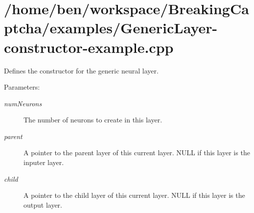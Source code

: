 \hypertarget{_2home_2ben_2workspace_2BreakingCaptcha_2examples_2GenericLayer-constructor-example_8cpp-example}{
\section{/home/ben/workspace/Breaking\-Captcha/examples/Generic\-Layer-constructor-example.cpp}
}
Defines the constructor for the generic neural layer.

\begin{Desc}
\item[Parameters:]
\begin{description}
\item[{\em num\-Neurons}]The number of neurons to create in this layer. \item[{\em parent}]A pointer to the parent layer of this current layer. NULL if this layer is the inputer layer. \item[{\em child}]A pointer to the child layer of this current layer. NULL if this layer is the output layer.\end{description}
\end{Desc}


\begin{DocInclude}\begin{verbatim}\end{verbatim}
\end{DocInclude}
 
